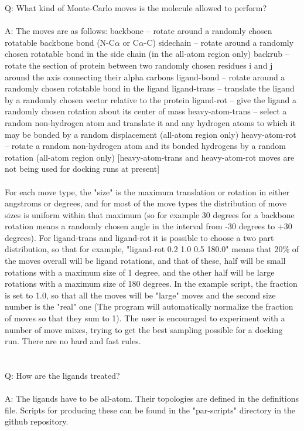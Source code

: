 \documentclass{article}      %
\begin{document}
Q:  What kind of Monte-Carlo moves is the molecule allowed to perform?
\\\\
A:  The moves are as follows:
backbone -- rotate around a randomly chosen rotatable backbone bond (N-C$\alpha$ or C$\alpha$-C)
sidechain -- rotate around a randomly chosen rotatable bond in the side chain (in the all-atom region only)
backrub -- rotate the section of protein between two randomly chosen residues i and j around the axis connecting their alpha carbons
ligand-bond -- rotate around a randomly chosen rotatable bond in the ligand 
ligand-trans -- translate the ligand by a randomly chosen vector relative to the protein
ligand-rot -- give the ligand a randomly chosen rotation about its center of mass
heavy-atom-trans -- select a random non-hydrogen atom and translate it and any hydrogen atoms to which it may be bonded by a random displacement (all-atom region only)
heavy-atom-rot -- rotate a random non-hydrogen atom and its bonded hydrogens by a random rotation (all-atom region only)
[heavy-atom-trans and heavy-atom-rot moves are not being used for docking runs at present]  
\\\\
For each move type, the "size" is the maximum translation or rotation in either angstroms or degrees, and for most of the move types the distribution of move sizes is uniform within that maximum (so for example 30 degrees for a backbone rotation means a randomly chosen angle in the interval from -30 degrees to +30 degrees). For ligand-trans and ligand-rot it is possible to choose a two part distribution, so that for example, "ligand-rot 0.2 1.0 0.5 180.0" means that 20\% of the moves overall will be ligand rotations, and that of these, half will be small rotations with a maximum size of 1 degree, and the other half will be large rotations with a maximum size of 180 degrees. In the example script, the fraction is set to 1.0, so that all the moves will be "large" moves and the second size number is the "real" one (The program will automatically normalize the fraction of moves so that they sum to 1). The user is encouraged to experiment with a number of move mixes, trying to get the best sampling possible for a docking run. There are no hard and fast rules.
\\\\\\
Q:  How are the ligands treated?
\\\\
A:  The ligands have to be all-atom. Their topologies are defined in the definitions file. Scripts for producing these can be found in the "par-scripts" directory in the github repository.
\end{document}
